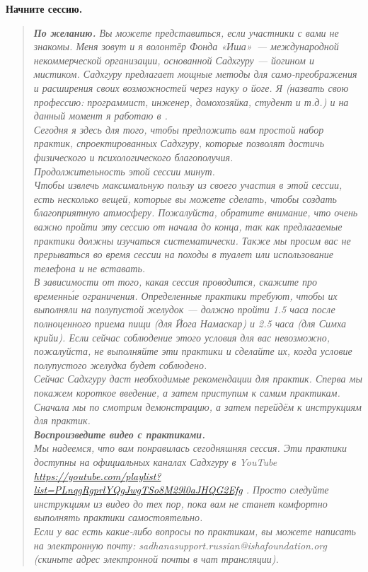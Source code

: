 \textbf{Начните сессию.}
\begin{quote}\emph{%
\noindent%
\textbf{По желанию.} {\color{CadetBlue}Вы можете представиться, если участники с вами не знакомы.} Меня зовут \underline{\qquad} и я волонтёр Фонда «Иша»~— международной некоммерческой организации, основанной Садхгуру — йогином и мистиком. Садхгуру предлагает мощные методы для само-преображения и расширения своих возможностей через науку о йоге.
        Я {\color{CadetBlue}(назвать свою профессию: программист, инженер, домохозяйка, студент и т.д.)} и на данный момент я работаю в \underline{\qquad}.
\\[10pt]
Сегодня я здесь для того, чтобы предложить вам простой набор практик,
спроектированных Садхгуру, которые позволят достичь физического и
психологического благополучия.
\\[3pt]
Продолжительность этой сессии \underline{\qquad} минут.
\\[3pt]
Чтобы извлечь максимальную пользу из своего участия в этой сессии, есть несколько вещей, которые вы можете сделать, чтобы создать благоприятную атмосферу. Пожалуйста, обратите внимание, что очень важно пройти эту сессию от начала до конца, так как предлагаемые практики должны изучаться систематически. Также мы просим вас не прерываться во время сессии на походы в туалет или использование телефона и не вставать.
\\[3pt]
{\color{CadetBlue}В зависимости от того, какая сессия проводится, скажите про временн\'{ы}е ограничения.} Определенные практики требуют, чтобы их выполняли на полупустой желудок — должно пройти 1.5 часа после полноценного приема пищи (для Йога Намаскар) и 2.5 часа (для Симха крийи). Если сейчас соблюдение этого условия для вас невозможно, пожалуйста, не выполняйте эти практики и сделайте их, когда условие полупустого желудка будет соблюдено.
\\[3pt]
Сейчас Садхгуру даст необходимые рекомендации для практик. Сперва мы покажем короткое введение, а затем приступим к самим практикам. Сначала мы по смотрим демонстрацию, а затем перейдём к инструкциям для практик.
\\[15pt]
\textbf{\color{CadetBlue}Воспроизведите видео с практиками.
}
\\[15pt]
Мы надеемся, что вам понравилась сегодняшняя сессия. Эти практики
доступны на официальных каналах Садхгуру в YouTube \\ 
\href{https://youtube.com/playlist?list=PLnqgRgprlYQgJwgTSo8M29l0aJHQG2Efg}{\tiny https://youtube.com/playlist?list=PLnqgRgprlYQgJwgTSo8M29l0aJHQG2Efg} . Просто следуйте
инструкциям из видео до тех пор, пока вам не станет комфортно выполнять
практики самостоятельно.
\\[3pt]
Если у вас есть какие-либо вопросы по практикам, вы можете написать на
электронную почту: sadhanasupport.russian@ishafoundation.org {\color{CadetBlue}(скиньте адрес электронной почты в чат трансляции).}
}\end{quote}

